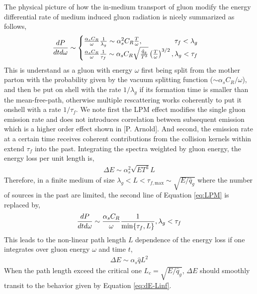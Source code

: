 \documentclass[aps, prc, reprint, amsmath, groupedaddress, nofootinbib]{revtex4-1}
\begin{document}
The physical picture of how the in-medium transport of gluon modify the energy differential rate of medium induced gluon radiation is nicely summarized as follows,
\begin{eqnarray}\label{eq:LPM}
\frac{dP}{dt d\omega} \sim \begin{cases}
 \frac{\alpha_s C_R}{\omega} \frac{1}{\lambda_g} \sim \alpha_s^2 C_R \frac{T}{\omega}, \hfill \tau_f < \lambda_g\\
 \frac{\alpha_s C_R}{\omega} \frac{1}{\tau_f}\sim \alpha_s C_R \sqrt{\frac{\hat{q}_g}{T^3}} \left(\frac{T}{\omega}\right)^{3/2}, \hfill \lambda_g < \tau_f
\end{cases}
\end{eqnarray}
This is understand as a gluon with energy $\omega$ first being split from the mother parton with the probability given by the vacuum splitting function ($\sim \alpha_s C_R/\omega$), and then be put on shell with the rate $1/\lambda_g$ if its formation time is smaller than the mean-free-path, otherwise multiple rescattering works coherently to put it onshell with a rate $1/\tau_f$. 
We note first the LPM effect modifies the single gluon emission rate and does not introduces correlation between subsequent emission which is a higher order effect shown in [P. Arnold].
And second, the emission rate at a certain time receives coherent contributions from the collision kernels within extend $\tau_f$ into the past.
Integrating the spectra weighted by gluon energy, the energy loss per unit length is,
\begin{eqnarray}\label{eq:dE-Linf}
\Delta E \sim \alpha_s^2 \sqrt{ET^3} L
\end{eqnarray}
Therefore, in a finite medium of size $\lambda_g < L< \tau_{f,\textrm{max}} \sim \sqrt{E/\hat{q}_g}$ where the number of sources in the past are limited, the second line of Equation \ref{eq:LPM} is replaced by,
\begin{eqnarray}
\frac{dP}{dt d\omega} \sim 
 \frac{\alpha_s C_R}{\omega} \frac{1}{\min\{\tau_f,L\}}, \hfill \lambda_g < \tau_f
\end{eqnarray}
This leads to the non-linear path length $L$ dependence of the energy loss if one integrates over gluon energy $\omega$ and time $t$,
\begin{eqnarray}\label{eq:dE-Lfinite}
\Delta E \sim \alpha_s \hat{q} L^2
\end{eqnarray}
When the path length exceed the critical one $L_c = \sqrt{E/\hat{q}_g}$, $\Delta E$ should smoothly transit to the behavior given by Equation \ref{eq:dE-Linf}.
\end{document}
